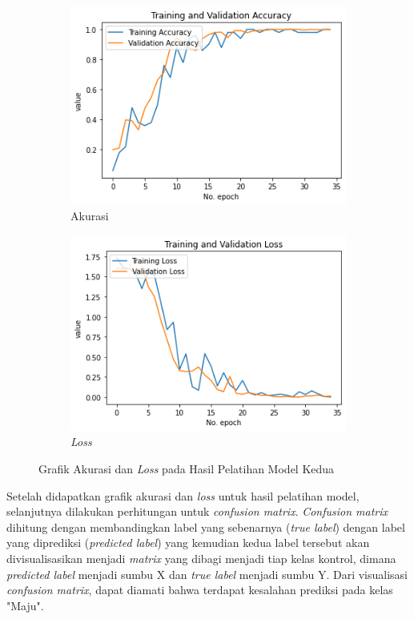 \begin{figure}[H]
  \centering
  \begin{subfigure}[b]{0.55\textwidth}
      \includegraphics[width=\textwidth]{gambar/bab4/model5 (30cm)/train.png}
      \caption{Akurasi}
  \end{subfigure}

  \begin{subfigure}[b]{0.55\textwidth}
      \includegraphics[width=\textwidth]{gambar/bab4/model5 (30cm)/loss.png}
      \caption{\emph{Loss}}
  \end{subfigure}
  \caption{Grafik Akurasi dan \emph{Loss} pada Hasil Pelatihan Model Kedua}
  \label{fig:acc_loss}
\end{figure}

Setelah didapatkan grafik akurasi dan \emph{loss} untuk hasil pelatihan model, selanjutnya dilakukan perhitungan untuk \emph{confusion matrix}. \emph{Confusion matrix} dihitung dengan membandingkan label yang sebenarnya (\emph{true label}) dengan label yang diprediksi (\emph{predicted label}) yang kemudian kedua label tersebut akan divisualisasikan menjadi \emph{matrix} yang dibagi menjadi tiap kelas kontrol, dimana \emph{predicted label} menjadi sumbu X dan \emph{true label} menjadi sumbu Y. Dari visualisasi \emph{confusion matrix}, dapat diamati bahwa terdapat kesalahan prediksi pada kelas "Maju".

